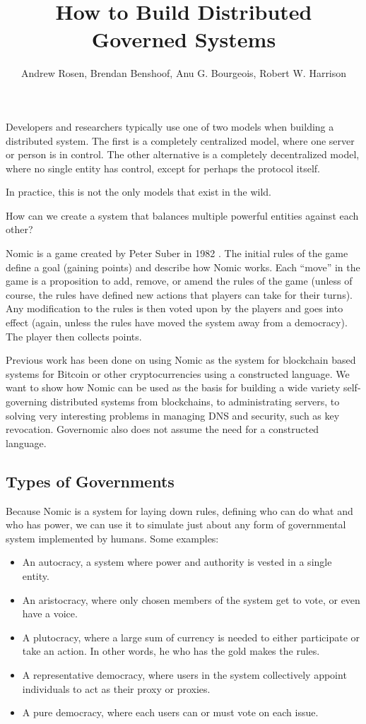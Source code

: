 \documentclass[11pt,letterpaper]{article}
\author{Andrew Rosen, Brendan Benshoof, Anu G. Bourgeois, Robert W. Harrison}
\date{}
\title{How to Build Distributed Governed Systems}
\begin{document}
	\maketitle
	
	
	Developers and researchers typically use one of two models when building a distributed system.
	The first is a completely centralized model, where one server or person is in control.
	The other alternative is a completely decentralized model, where no single entity has control, except for perhaps the protocol itself.
	
	In practice, this is not the only models that exist in the wild.  
	
	How can we create a system that balances multiple powerful entities against each other?
	
	


	Nomic is a game created by Peter Suber in 1982 \cite{nomic}.
	The initial rules of the game define a goal (gaining points) and describe how Nomic works.
	Each ``move'' in the game is a proposition to add, remove, or amend the rules of the game (unless of course, the rules have defined new actions that players can take for their turns).
	Any modification to the rules is then voted upon by the players and goes into effect (again, unless the rules have moved the system away from a democracy).
	The player then collects points.
	
	Previous work has been done on using Nomic as the system for blockchain based systems for Bitcoin or other cryptocurrencies \cite{tezos} using a constructed language.
	We want to show how Nomic can be used as the basis for building a wide variety self-governing distributed systems from blockchains, to administrating servers, to solving very interesting problems in managing DNS and security, such as key revocation.
	Governomic also does not assume the need for a constructed language.
	
	
	\subsection{Types of Governments}
	Because Nomic is a system for laying down rules, defining who can do what and who has power, we can use it to simulate just about any form of governmental system implemented by humans. 
	Some examples:
	\begin{itemize}
		\item An autocracy, a system where power and authority is vested in a single entity. 
		\item An aristocracy, where only chosen members of the system get to vote, or even have a voice.
		\item A plutocracy, where a large sum of currency is needed to either participate or take an action. In other words, he who has the gold makes the rules.
		\item A representative democracy, where users in the system collectively appoint individuals to act as their proxy or proxies.
		\item A pure democracy, where each users can or must vote on each issue.
	\end{itemize}
	
\end{document}
